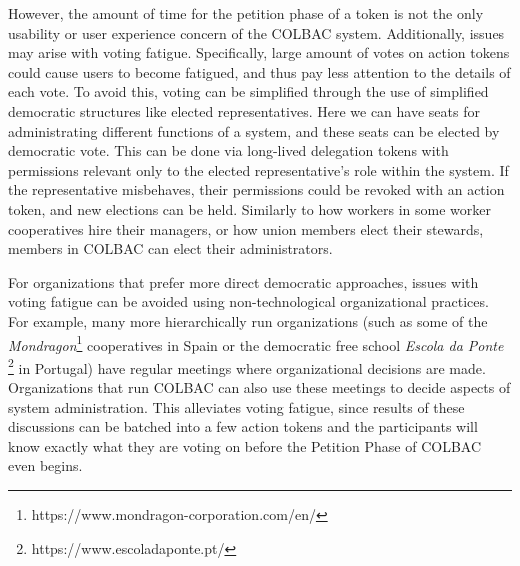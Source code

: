 
However, the amount of time for the petition phase of a token is not the only
usability or user experience concern of the COLBAC system. Additionally, issues
may arise with voting fatigue. Specifically, large amount of votes on action
tokens could cause users to become fatigued, and thus pay less attention to the
details of each vote. To avoid this, voting can be simplified through the use of
simplified democratic structures like elected representatives. Here we can have
seats for administrating different functions of a system, and these seats can be
elected by democratic vote. This can be done via long-lived delegation tokens
with permissions relevant only to the elected representative's role within the
system. If the representative misbehaves, their permissions could be revoked
with an action token, and new elections can be held. Similarly to how workers in
some worker cooperatives hire their managers, or how union members elect their
stewards, members in COLBAC can elect their administrators.

For organizations that prefer more direct democratic approaches, issues with
voting fatigue can be avoided using non-technological organizational practices.
For example, many more hierarchically run organizations (such as some of the 
\textit{Mondragon}\footnote{https://www.mondragon-corporation.com/en/}
cooperatives in Spain or the democratic free school \textit{Escola da Ponte}
\footnote{https://www.escoladaponte.pt/} in Portugal) have regular meetings
where organizational decisions are made. Organizations that run COLBAC can also
use these meetings to decide aspects of system administration. This alleviates
voting fatigue, since results of these discussions can be batched into a few
action tokens and the participants will know exactly what they are voting on
before the Petition Phase of COLBAC even begins.
